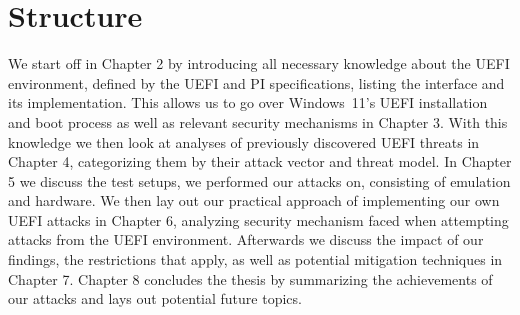 \section*{Structure}

We start off in Chapter 2 by introducing all necessary knowledge about the \ac{UEFI} environment, defined by the \ac{UEFI} and \ac{PI} specifications, listing the interface and its implementation.
This allows us to go over Windows~11's \ac{UEFI} installation and boot process as well as relevant security mechanisms in Chapter 3.
With this knowledge we then look at analyses of previously discovered \ac{UEFI} threats in Chapter 4, categorizing them by their attack vector and threat model.
In Chapter 5 we discuss the test setups, we performed our attacks on, consisting of emulation and hardware.
We then lay out our practical approach of implementing our own \ac{UEFI} attacks in Chapter 6, analyzing security mechanism faced when attempting attacks from the UEFI environment.
Afterwards we discuss the impact of our findings, the restrictions that apply, as well as potential mitigation techniques in Chapter 7.
Chapter 8 concludes the thesis by summarizing the achievements of our attacks and lays out potential future topics.
